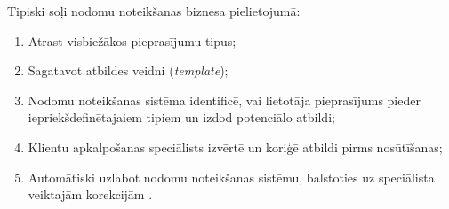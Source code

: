 Tipiski soļi nodomu noteikšanas biznesa pielietojumā:
\begin{enumerate}
	\item Atrast visbiežākos pieprasījumu tipus;
	\item Sagatavot atbildes veidni (\textit{template});
	\item Nodomu noteikšanas sistēma identificē, vai lietotāja pieprasījums pieder iepriekšdefinētajaiem tipiem un izdod potenciālo atbildi;
	\item Klientu apkalpošanas speciālists izvērtē un koriģē atbildi pirms nosūtīšanas;
	\item Automātiski uzlabot nodomu noteikšanas sistēmu, balstoties uz speciālista veiktajām korekcijām \cite{paikens2020}.
\end{enumerate}
